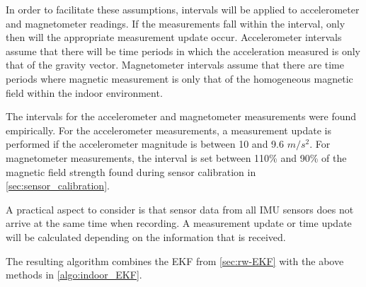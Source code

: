 In order to facilitate these assumptions, intervals will be applied to accelerometer and magnetometer readings. If the measurements fall within the interval, only then will the appropriate measurement update occur. Accelerometer intervals assume that there will be time periods in which the acceleration measured is only that of the gravity vector. Magnetometer intervals assume that there are time periods where magnetic measurement is only that of the homogeneous magnetic field within the indoor environment. \par 

The intervals for the accelerometer and magnetometer measurements were found empirically. For the accelerometer measurements, a measurement update is performed if the accelerometer magnitude is between 10 and 9.6 $ m/s^2 $. For magnetometer measurements, the interval is set between 110\% and 90\% of the magnetic field strength found during sensor calibration in \cref{sec:sensor_calibration}. \par 

A practical aspect to consider is that sensor data from all IMU sensors does not arrive at the same time when recording. A measurement update or time update will be calculated depending on the information that is received. \par 

The resulting algorithm combines the EKF from \cref{sec:rw-EKF} with the above methods in \cref{algo:indoor_EKF}.

